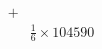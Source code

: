 \documentclass[preview]{standalone}
\begin{document}
\begin{align*}
+&\\&\frac{1}{6}\times104590
\end{align*}
\end{document}
